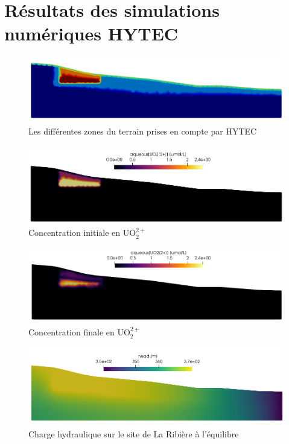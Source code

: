 \documentclass{article}
\begin{document}
\newpage
\section{Résultats des simulations numériques HYTEC}
\begin{figure}[H]
    \centering
    \includegraphics[width=\linewidth]{LJ-zones-HYTEC-final.png}
    \caption{Les différentes zones du terrain prises en compte par HYTEC}
    \label{fig:zones_HYTEC}
\end{figure}


\begin{figure}[H]
    \centering
    \includegraphics[width=\linewidth]{LJ-UO22P-initial.png}
    \caption{Concentration initiale en UO$_2^{2+}$}
    \label{fig:uo2P-initial}
\end{figure}
\begin{figure}[H]
    \centering
    \includegraphics[width=\linewidth]{LJ-UO22P-final.PNG}
    \caption{Concentration finale en UO$_2^{2+}$}
    \label{fig:uo2P-final}
\end{figure}
\newpage

\begin{figure}[H]
    \centering
    \includegraphics[width=\linewidth]{LJ-charge-hydraulique-finale.PNG}
    \caption{Charge hydraulique sur le site de La Ribière à l'équilibre}
    \label{fig:charge_hydro_finale}
\end{figure}
\end{document}
